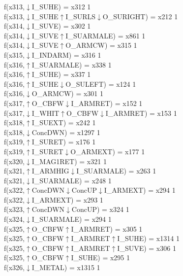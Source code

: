 f(x313,$\downarrow$I\_SUHE) = x312 {1} \\
f(x313,$\downarrow$I\_SUHE$\uparrow$I\_SURLS$\downarrow$O\_SURIGHT) = x212 {1} \\
f(x314,$\downarrow$I\_SUVE) = x302 {1} \\
f(x314,$\downarrow$I\_SUVE$\uparrow$I\_SUARMALE) = x861 {1} \\
f(x314,$\downarrow$I\_SUVE$\uparrow$O\_ARMCW) = x315 {1} \\
f(x315,$\downarrow$I\_INDARM) = x316 {1} \\
f(x316,$\uparrow$I\_SUARMALE) = x338 {1} \\
f(x316,$\uparrow$I\_SUHE) = x337 {1} \\
f(x316,$\uparrow$I\_SUHE$\downarrow$O\_SULEFT) = x124 {1} \\
f(x316,$\downarrow$O\_ARMCW) = x301 {1} \\
f(x317,$\uparrow$O\_CBFW$\downarrow$I\_ARMRET) = x152 {1} \\
f(x317,$\downarrow$I\_WHIT$\uparrow$O\_CBFW$\downarrow$I\_ARMRET) = x153 {1} \\
f(x318,$\uparrow$I\_SUEXT) = x242 {1} \\
f(x318,$\downarrow$ConcDWN) = x1297 {1} \\
f(x319,$\uparrow$I\_SURET) = x176 {1} \\
f(x319,$\uparrow$I\_SURET$\downarrow$O\_ARMEXT) = x177 {1} \\
f(x320,$\downarrow$I\_MAG1RET) = x321 {1} \\
f(x321,$\uparrow$I\_ARMHIG$\downarrow$I\_SUARMALE) = x263 {1} \\
f(x321,$\downarrow$I\_SUARMALE) = x248 {1} \\
f(x322,$\uparrow$ConcDWN$\downarrow$ConcUP$\downarrow$I\_ARMEXT) = x294 {1} \\
f(x322,$\downarrow$I\_ARMEXT) = x293 {1} \\
f(x323,$\uparrow$ConcDWN$\downarrow$ConcUP) = x324 {1} \\
f(x324,$\downarrow$I\_SUARMALE) = x294 {1} \\
f(x325,$\uparrow$O\_CBFW$\uparrow$I\_ARMRET) = x305 {1} \\
f(x325,$\uparrow$O\_CBFW$\uparrow$I\_ARMRET$\uparrow$I\_SUHE) = x1314 {1} \\
f(x325,$\uparrow$O\_CBFW$\uparrow$I\_ARMRET$\uparrow$I\_SUVE) = x306 {1} \\
f(x325,$\uparrow$O\_CBFW$\uparrow$I\_SUHE) = x295 {1} \\
f(x326,$\downarrow$I\_METAL) = x1315 {1} \\
